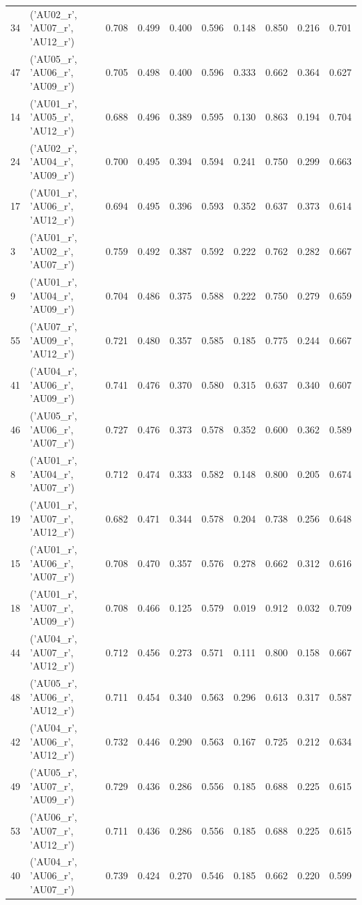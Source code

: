 \begin{tabular}{llrrrrrrrr}
34 & ('AU02_r', 'AU07_r', 'AU12_r') & 0.708 & 0.499 & 0.400 & 0.596 & 0.148 & 0.850 & 0.216 & 0.701 \\
47 & ('AU05_r', 'AU06_r', 'AU09_r') & 0.705 & 0.498 & 0.400 & 0.596 & 0.333 & 0.662 & 0.364 & 0.627 \\
14 & ('AU01_r', 'AU05_r', 'AU12_r') & 0.688 & 0.496 & 0.389 & 0.595 & 0.130 & 0.863 & 0.194 & 0.704 \\
24 & ('AU02_r', 'AU04_r', 'AU09_r') & 0.700 & 0.495 & 0.394 & 0.594 & 0.241 & 0.750 & 0.299 & 0.663 \\
17 & ('AU01_r', 'AU06_r', 'AU12_r') & 0.694 & 0.495 & 0.396 & 0.593 & 0.352 & 0.637 & 0.373 & 0.614 \\
3 & ('AU01_r', 'AU02_r', 'AU07_r') & 0.759 & 0.492 & 0.387 & 0.592 & 0.222 & 0.762 & 0.282 & 0.667 \\
9 & ('AU01_r', 'AU04_r', 'AU09_r') & 0.704 & 0.486 & 0.375 & 0.588 & 0.222 & 0.750 & 0.279 & 0.659 \\
55 & ('AU07_r', 'AU09_r', 'AU12_r') & 0.721 & 0.480 & 0.357 & 0.585 & 0.185 & 0.775 & 0.244 & 0.667 \\
41 & ('AU04_r', 'AU06_r', 'AU09_r') & 0.741 & 0.476 & 0.370 & 0.580 & 0.315 & 0.637 & 0.340 & 0.607 \\
46 & ('AU05_r', 'AU06_r', 'AU07_r') & 0.727 & 0.476 & 0.373 & 0.578 & 0.352 & 0.600 & 0.362 & 0.589 \\
8 & ('AU01_r', 'AU04_r', 'AU07_r') & 0.712 & 0.474 & 0.333 & 0.582 & 0.148 & 0.800 & 0.205 & 0.674 \\
19 & ('AU01_r', 'AU07_r', 'AU12_r') & 0.682 & 0.471 & 0.344 & 0.578 & 0.204 & 0.738 & 0.256 & 0.648 \\
15 & ('AU01_r', 'AU06_r', 'AU07_r') & 0.708 & 0.470 & 0.357 & 0.576 & 0.278 & 0.662 & 0.312 & 0.616 \\
18 & ('AU01_r', 'AU07_r', 'AU09_r') & 0.708 & 0.466 & 0.125 & 0.579 & 0.019 & 0.912 & 0.032 & 0.709 \\
44 & ('AU04_r', 'AU07_r', 'AU12_r') & 0.712 & 0.456 & 0.273 & 0.571 & 0.111 & 0.800 & 0.158 & 0.667 \\
48 & ('AU05_r', 'AU06_r', 'AU12_r') & 0.711 & 0.454 & 0.340 & 0.563 & 0.296 & 0.613 & 0.317 & 0.587 \\
42 & ('AU04_r', 'AU06_r', 'AU12_r') & 0.732 & 0.446 & 0.290 & 0.563 & 0.167 & 0.725 & 0.212 & 0.634 \\
49 & ('AU05_r', 'AU07_r', 'AU09_r') & 0.729 & 0.436 & 0.286 & 0.556 & 0.185 & 0.688 & 0.225 & 0.615 \\
53 & ('AU06_r', 'AU07_r', 'AU12_r') & 0.711 & 0.436 & 0.286 & 0.556 & 0.185 & 0.688 & 0.225 & 0.615 \\
40 & ('AU04_r', 'AU06_r', 'AU07_r') & 0.739 & 0.424 & 0.270 & 0.546 & 0.185 & 0.662 & 0.220 & 0.599 \\
\bottomrule
\end{tabular}
